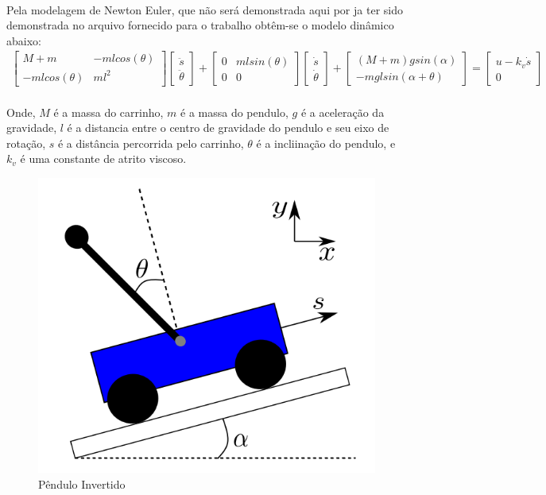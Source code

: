 \documentclass[a4paper,10pt]{article}
\begin{document}
\paragraph{} Pela modelagem de Newton Euler, que não será demonstrada aqui por ja ter sido demonstrada no arquivo fornecido para o trabalho obtêm-se o modelo dinâmico abaixo:
\begin{gather}
	\begin{bmatrix}
		M+m & -mlcos(\theta) \\
		-mlcos(\theta) & ml^2
	\end{bmatrix}\begin{bmatrix}
	\ddot{s} \\ \ddot{\theta}
\end{bmatrix} + \begin{bmatrix}
0 & mlsin(\theta) \\
0 & 0
\end{bmatrix}\begin{bmatrix}
\dot{s} \\ \dot{\theta}
\end{bmatrix} + \begin{bmatrix}
(M+m)gsin(\alpha) \\
-mglsin(\alpha+\theta)
\end{bmatrix} = \begin{bmatrix}
u - k_v\dot{s} \\
0
\end{bmatrix}
\label{eqdyn}
\end{gather}
\paragraph{}Onde, $M$ é a massa do carrinho, $m$ é a massa do pendulo, $g$ é a aceleração da gravidade, $l$ é a distancia entre o centro de gravidade do pendulo e seu eixo de rotação, $s$ é a distância percorrida pelo carrinho, $\theta$ é a incliinação do pendulo, e $k_v$ é uma constante de atrito viscoso.
\begin{figure}[h]
	\centering
	\includegraphics[scale=0.5]{fig/pendulo}
	\caption{Pêndulo Invertido}
\end{figure}
\end{document}
